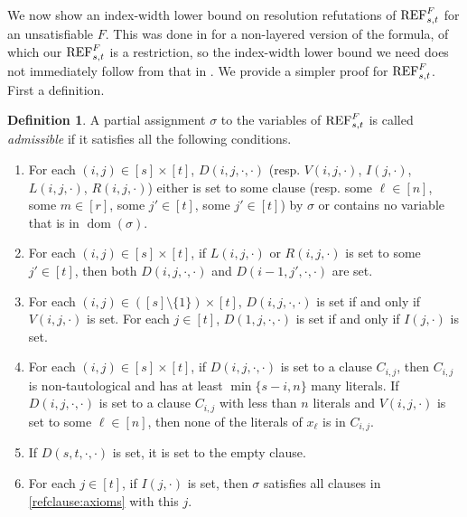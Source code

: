 \documentclass[10pt,a4paper]{article}
\theoremstyle{remark}
\newtheorem*{switching lemma}{Switching Lemma}
\newtheorem*{open problem}{Open Problem}
\theoremstyle{definition}
\newtheorem{definition}[theorem]{Definition}
\DeclareMathOperator{\dom}{dom}
\begin{document}
We now show an index-width lower bound on resolution refutations of $\textnormal{REF}^{F}_{s,t}$ for an unsatisfiable $F$. This was done in \cite{atserias-muller2019-focs} for a non-layered version of the formula, of which our $\textnormal{REF}^{F}_{s,t}$ is a restriction, so the index-width lower bound we need does not immediately follow from that in \cite{atserias-muller2019-focs}. We provide a simpler proof for $\textnormal{REF}^{F}_{s,t}$. First a definition. 

\begin{definition} \label{def:admissible}
A partial assignment $\sigma$ to the variables of $\textnormal{REF}^{F}_{s,t}$ is called \emph{admissible} if it satisfies all the following conditions.
\begin{enumerate}[({A}1)]
\item \label{item:admissible-set-or-untouched} For each $(i,j) \in [s] \times [t]$, $D(i,j,\cdot,\cdot)$ (resp. $V(i,j,\cdot)$, $I(j,\cdot)$, $L(i,j,\cdot)$, $R(i,j,\cdot)$) either is set to some clause (resp. some $\ell \in [n]$, some $m \in [r]$, some $j' \in [t]$, some $j' \in [t]$) by $\sigma$ or contains no variable that is in $\dom(\sigma)$. 

\item \label{item:admissible-RL-implies-D} For each $(i,j) \in [s] \times [t]$, if $L(i,j,\cdot)$ or $R(i,j,\cdot)$ is set to some  $j' \in [t]$, then both $D(i,j,\cdot,\cdot)$ and $D(i-1,j',\cdot,\cdot)$ are set.

\item \label{item:admissible-D-iff-V,I} For each $(i,j) \in ([s] \setminus \{1\}) \times [t]$, $D(i,j,\cdot,\cdot)$ is set if and only if $V(i,j,\cdot)$ is set. For each $j \in [t]$,  $D(1,j,\cdot,\cdot)$ is set if and only if $I(j,\cdot)$ is set.

\item \label{item:admissible-D-nontaut-and-fat} For each $(i,j) \in [s] \times [t]$, if $D(i,j,\cdot,\cdot)$ is set to a clause $C_{i,j}$, then $C_{i,j}$ is non-tautological and has at least $\min\{s-i, n\}$ many literals. If $D(i,j,\cdot,\cdot)$ is set to a clause $C_{i,j}$ with less than $n$ literals and $V(i,j,\cdot)$ is set to some $\ell \in [n]$, then none of the literals of $x_\ell$ is in $C_{i,j}$.

\item \label{item:admissible-empty-clause} If $D(s,t, \cdot , \cdot)$ is set, it is set to the empty clause.

\item \label{item:admissible-I}For each $j \in [t]$, if $I(j,\cdot)$ is set, then $\sigma$ satisfies all clauses in \eqref{refclause:axioms} with this $j$.


\end{enumerate}
\end{definition}
\end{document}
